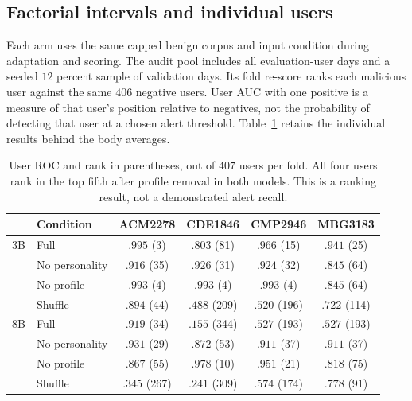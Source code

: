 \subsection{Factorial intervals and individual users}
\label{app:factorial}

Each arm uses the same capped benign corpus and input condition during
adaptation and scoring. The audit pool includes all evaluation-user days
and a seeded $12$ percent sample of validation days. Its fold re-score
ranks each malicious user against the same $406$ negative users.
User AUC with one positive is a measure of that user's position relative
to negatives, not the probability of detecting that user at a chosen
alert threshold. Table~\ref{tab:readable_factorial} retains the individual
results behind the body averages.

\begin{table}[htbp]
\centering\small
\begin{tabular}{llcccc}
\toprule
 & Condition & ACM2278 & CDE1846 & CMP2946 & MBG3183 \\
\midrule
3B & Full & $.995$ (3) & $.803$ (81) & $.966$ (15) & $.941$ (25) \\
 & No personality & $.916$ (35) & $.926$ (31) & $.924$ (32) & $.845$ (64) \\
 & No profile & $.993$ (4) & $.993$ (4) & $.993$ (4) & $.845$ (64) \\
 & Shuffle & $.894$ (44) & $.488$ (209) & $.520$ (196) & $.722$ (114) \\
\midrule
8B & Full & $.919$ (34) & $.155$ (344) & $.527$ (193) & $.527$ (193) \\
 & No personality & $.931$ (29) & $.872$ (53) & $.911$ (37) & $.911$ (37) \\
 & No profile & $.867$ (55) & $.978$ (10) & $.951$ (21) & $.818$ (75) \\
 & Shuffle & $.345$ (267) & $.241$ (309) & $.574$ (174) & $.778$ (91) \\
\bottomrule
\end{tabular}
\caption{User ROC and rank in parentheses, out of $407$ users per fold.
All four users rank in the top fifth after profile removal in both
models. This is a ranking result, not a demonstrated alert recall.}
\label{tab:readable_factorial}
\end{table}

